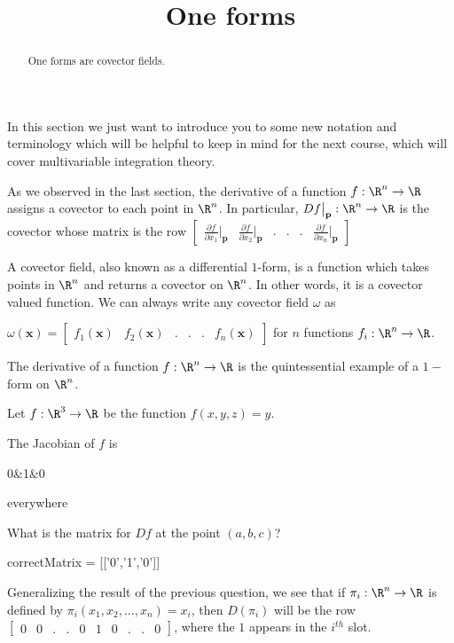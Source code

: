 \documentclass{ximera}
\title{One forms}
\begin{document}
	\begin{abstract}
		One forms are covector fields.
	\end{abstract}
	
	In this section we just want to introduce you to some new notation and terminology which will be helpful to keep in mind for the next course, which
	will cover multivariable integration theory.
	
	As we observed in the last section, the derivative of  a function $f:\R^n \to \R$ assigns a covector to each point in $\R^n$.  In particular,
	$Df\big|_{\mathbf{p}} : \R^n \to \R$ is the covector whose matrix is the row 
	\(\begin{bmatrix} \frac{\partial f}{\partial x_1}\big|_{\mathbf{p}} & \frac{\partial f}{\partial x_2}\big|_{\mathbf{p}} & .&.&.& \frac{\partial f}{\partial x_n}\big|_{\mathbf{p}}\end{bmatrix}\)
	
	\begin{definition}
		A covector field, also known as a differential $1$-form, is a function which takes points in $\R^n$ and returns a covector on $\R^n$.  In other words, it is a covector
		valued function.  We can always write any covector field $\omega$ as
		
		$\omega(\mathbf{x}) = \begin{bmatrix} f_1(\mathbf{x}) &  f_2(\mathbf{x}) & .& .& .&  f_n(\mathbf{x})  \end{bmatrix}$ for $n$ functions $f_i:\R^n \to \R$.
	\end{definition}
	
	The derivative of a function $f:\R^n \to \R$ is the quintessential example of a $1-$form on $\R^n$.
	
	\begin{question}
		Let $f:\R^3 \to \R$ be the function $f(x,y,z)= y$. 
		\begin{solution}
		\begin{hint}
			The Jacobian of $f$ is  \begin{bmatrix} 0&1&0 \end{bmatrix} everywhere
		\end{hint}
		 What is the matrix for $Df$ at the point $(a,b,c)$?
		 	\begin{matrix-answer}
		 		correctMatrix = [['0','1','0']]
		 	\end{matrix-answer}
		 \end{solution}
	\end{question}
	
	Generalizing the result of the previous question, we see that if $\pi_i:\R^n \to \R$ is defined by $\pi_i(x_1,x_2,...,x_n) = x_i$, then $D(\pi_i)$ will
	be the row $\begin{bmatrix} 0&0&.&.&0&1&0&.&.&0\end{bmatrix}$, where the $1$ appears in the $i^{th}$ slot.
	
\end{document}
